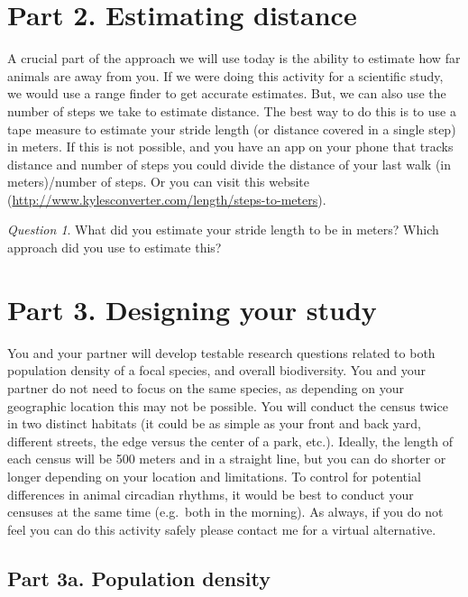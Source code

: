 \documentclass[]{book}
\begin{document}
\hypertarget{part-2.-estimating-distance}{%
\section*{Part 2. Estimating distance}\label{part-2.-estimating-distance}}

A crucial part of the approach we will use today is the ability to estimate how far animals are away from you. If we were doing this activity for a scientific study, we would use a range finder to get accurate estimates. But, we can also use the number of steps we take to estimate distance. The best way to do this is to use a tape measure to estimate your stride length (or distance covered in a single step) in meters. If this is not possible, and you have an app on your phone that tracks distance and number of steps you could divide the distance of your last walk (in meters)/number of steps. Or you can visit this website (\url{http://www.kylesconverter.com/length/steps-to-meters}).

\emph{Question 1}. What did you estimate your stride length to be in meters? Which approach did you use to estimate this?

\hypertarget{part-3.-designing-your-study}{%
\section*{Part 3. Designing your study}\label{part-3.-designing-your-study}}

You and your partner will develop testable research questions related to both population density of a focal species, and overall biodiversity. You and your partner do not need to focus on the same species, as depending on your geographic location this may not be possible. You will conduct the census twice in two distinct habitats (it could be as simple as your front and back yard, different streets, the edge versus the center of a park, etc.). Ideally, the length of each census will be 500 meters and in a straight line, but you can do shorter or longer depending on your location and limitations. To control for potential differences in animal circadian rhythms, it would be best to conduct your censuses at the same time (e.g.~both in the morning). As always, if you do not feel you can do this activity safely please contact me for a virtual alternative.

\hypertarget{part-3a.-population-density}{%
\subsection*{Part 3a. Population density}\label{part-3a.-population-density}}
\end{document}
